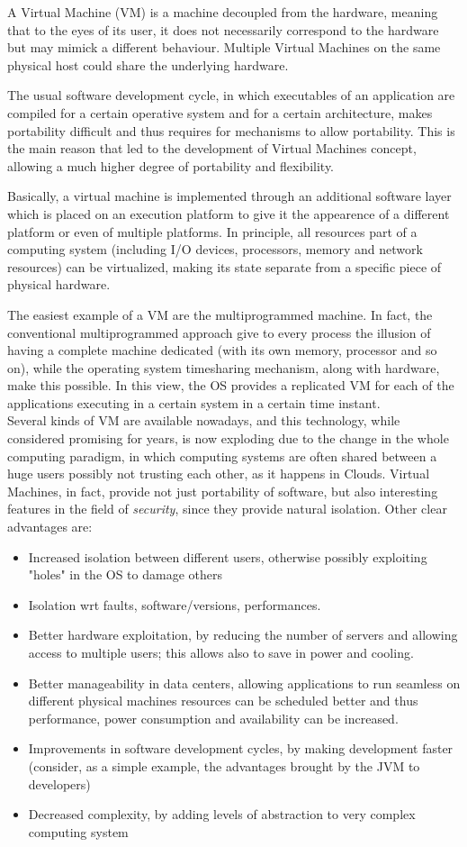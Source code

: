 A Virtual Machine (VM) is a machine decoupled from the hardware, meaning that to the eyes of its user, it does not necessarily correspond to the hardware but may mimick a different behaviour. 
Multiple Virtual Machines on the same physical host could share the underlying hardware.

The usual software development cycle, in which executables of an application are compiled for a certain operative system and for a certain architecture, makes portability difficult and thus requires for mechanisms to allow portability.
This is the main reason that led to the development of Virtual Machines concept, allowing a much higher degree of portability and flexibility.

Basically, a virtual machine is implemented through an additional software layer which is placed on an execution platform to give it the appearence of a different platform or even of multiple platforms.
In principle, all resources part of a computing system (including I/O devices, processors, memory and network resources) can be virtualized, making its state separate from a specific piece of physical hardware.

The easiest example of a VM are the multiprogrammed machine. In fact, the conventional multiprogrammed approach give to every process the illusion of having a complete machine dedicated (with its own memory, processor and so on), while the operating system timesharing mechanism,
along with hardware, make this possible. In this view, the OS provides a replicated VM for each of the applications executing in a certain system in a certain time instant.
\\
Several kinds of VM are available nowadays, and this technology, while considered promising for years, is now exploding due to the change in
the whole computing paradigm, in which computing systems are often shared between a huge users possibly not trusting each other, as it happens
in Clouds.
Virtual Machines, in fact, provide not just portability of software, but also interesting features in the field of \emph{security}, since they provide natural isolation. Other clear advantages are:
\begin{itemize}
\item Increased isolation between different users, otherwise possibly exploiting "holes" in the OS to damage others
\item Isolation wrt faults, software/versions, performances.
\item Better hardware exploitation, by reducing the number of servers and allowing access to multiple users; this allows also to save in power and cooling.
\item Better manageability in data centers, allowing applications to run seamless on different physical machines resources can be scheduled better and thus performance, power consumption and availability can be increased.
\item Improvements in software development cycles, by making development faster (consider, as a simple example, the advantages brought by the JVM to developers) 
\item Decreased complexity, by adding levels of abstraction to very complex computing system
\end{itemize}

